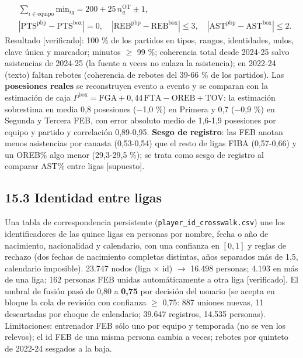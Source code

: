 \documentclass[10pt,a4paper]{article}
\begin{document}
\[
\begin{aligned} &\textstyle\sum_{i \in \text{equipo}} \mathrm{min}_{ig} = 200 + 25\,n^{\mathrm{OT}}_{g} \pm 1,\\ &|\mathrm{PTS}^{\mathrm{pbp}} - \mathrm{PTS}^{\mathrm{box}}| = 0,\quad |\mathrm{REB}^{\mathrm{pbp}} - \mathrm{REB}^{\mathrm{box}}| \le 3,\quad |\mathrm{AST}^{\mathrm{pbp}} - \mathrm{AST}^{\mathrm{box}}| \le 2 . \end{aligned}
\]
Resultado [verificado]: 100 \% de los partidos en tipos, rangos, identidades, nulos, clave única y marcador; minutos \ensuremath{\geq} 99 \%; coherencia total desde 2024-25 salvo asistencias de 2024-25 (la fuente a veces no enlaza la asistencia); en 2022-24 (texto) faltan rebotes (coherencia de rebotes del 39-66 \% de los partidos). Las \textbf{posesiones reales} se reconstruyen evento a evento y se comparan con la estimación de caja $P^{\mathrm{box}} = \mathrm{FGA} + 0{,}44\,\mathrm{FTA} - \mathrm{OREB} + \mathrm{TOV}$: la estimación sobrestima en media 0,8 posesiones (\ensuremath{-}1,0 \%) en Primera y 0,7 (\ensuremath{-}0,9 \%) en Segunda y Tercera FEB, con error absoluto medio de 1,6-1,9 posesiones por equipo y partido y correlación 0,89-0,95. \textbf{Sesgo de registro}: las FEB anotan menos asistencias por canasta (0,53-0,54) que el resto de ligas FIBA (0,57-0,66) y un OREB\% algo menor (29,3-29,5 \%); se trata como sesgo de registro al comparar AST\% entre ligas [supuesto].

\subsection*{15.3 Identidad entre ligas}
Una tabla de correspondencia persistente (\texttt{player\_id\_crosswalk.csv}) une los identificadores de las quince ligas en personas por nombre, fecha o año de nacimiento, nacionalidad y calendario, con una confianza en $[0,1]$ y reglas de rechazo (dos fechas de nacimiento completas distintas, años separados más de 1,5, calendario imposible). 23.747 nodos (liga \ensuremath{\times} id) \ensuremath{\to} 16.498 personas; 4.193 en más de una liga; 162 personas FEB unidas automáticamente a otra liga [verificado]. El umbral de fusión pasó de 0,80 a \textbf{0,75} por decisión del usuario (se acepta en bloque la cola de revisión con confianza \ensuremath{\geq} 0,75: 887 uniones nuevas, 11 descartadas por choque de calendario; 39.647 registros, 14.535 personas). Limitaciones: entrenador FEB sólo uno por equipo y temporada (no se ven los relevos); el id FEB de una misma persona cambia a veces; rebotes por quinteto de 2022-24 sesgados a la baja.
\end{document}
